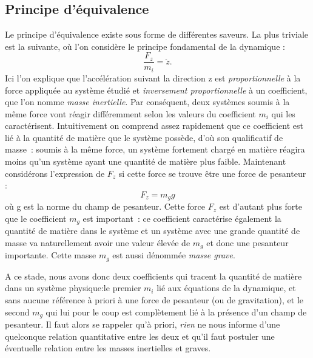 \subsection{Principe d'équivalence}
Le principe d'équivalence existe sous forme de différentes saveurs. La plus triviale est la suivante, où l'on considère le principe fondamental de la dynamique :
\begin{equation}
\frac{F_z}{m_i}=\ddot z.
\end{equation}
Ici l'on explique que l'accélération suivant la direction z est \textit{proportionnelle} à la force appliquée au système étudié et \textit{inversement proportionnelle} à un coefficient, que l'on nomme \textit{masse inertielle}. Par conséquent, deux systèmes soumis à la même force vont réagir différemment selon les valeurs du coefficient $m_i$ qui les caractérisent. Intuitivement on comprend assez rapidement que ce coefficient est lié à la quantité de matière que le système possède, d'où son qualificatif de masse~: soumis à la même force, un système fortement chargé en matière réagira moins qu'un système ayant une quantité de matière plus faible. Maintenant considérons l'expression de $F_z$ si cette force se trouve être une force de pesanteur :
\begin{equation}
F_z=m_g g
\end{equation}
où g est la norme du champ de pesanteur. Cette force $F_z$ est d'autant plus forte que le coefficient $m_g$ est important~: ce coefficient caractérise également la quantité de matière dans le système et un système avec une grande quantité de masse va naturellement avoir une valeur élevée de $m_g$ et donc une pesanteur importante. Cette masse $m_g$ est aussi dénommée \textit{masse grave}.

A ce stade, nous avons donc deux coefficients qui tracent la quantité de matière dans un système physique:le premier $m_i$ lié aux équations de la dynamique, et sans aucune référence à priori à une force de pesanteur (ou de gravitation),  et le second $m_g$ qui lui pour le coup est complètement lié à la présence d'un champ de pesanteur. Il faut alors se rappeler qu'à priori, \textit{rien} ne nous informe d'une quelconque relation quantitative entre les deux et qu'il faut postuler une éventuelle relation entre les masses inertielles et graves.

